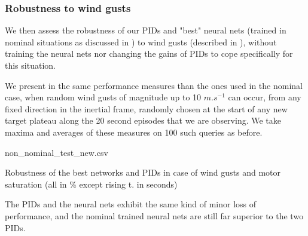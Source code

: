 \documentclass[anonymous=true,format=sigconf, screen=true, review=false]{acmart}
\begin{document}



\subsubsection{Robustness to wind gusts}

We then assess the robustness of our PIDs and "best" neural nets (trained in nominal situations as discussed in  ) to wind gusts (described in ), without training the neural nets nor changing the gains of PIDs to cope specifically for this situation. 

We present in 
the same performance measures than the ones used in the nominal case, when random wind gusts of magnitude up to 10 $m.s^{-1}$ can occur, from any fixed direction in the inertial frame, randomly chosen at the start of any new target plateau along the 20 second episodes that we are observing. We take maxima and averages of these measures on 100 such queries as before. %

\begin{csvtable*}{non_nominal_test_new.csv}
\caption{Robustness of the best networks and PIDs in case of wind gusts and motor saturation (all in \% except rising t. in seconds)}
\label{table:robustnonnominal}
\label{table:robustwindgust}
\label{table:robustmotorfail}
\end{csvtable*}

The PIDs and the neural nets exhibit the same kind of minor loss of performance, and the nominal trained neural nets are still far superior to the two PIDs. 
\end{document}
